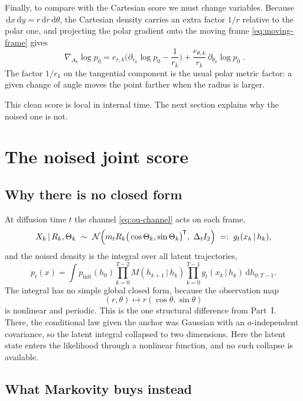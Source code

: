 \documentclass[11pt,a4paper]{article}
\newcommand{\N}{\mathcal{N}}
\newcommand{\given}{\,\vert\,}
\newcommand{\mt}{m_t}
\newcommand{\Dt}{\Delta_t}
\newcommand{\dd}{\,\mathrm d}
\newcommand{\T}{^{\mkern-1.5mu\mathsf{T}}}
\begin{document}
Finally, to compare with the Cartesian score we must change variables. Because
$\dd x\dd y=r\dd r\dd\theta$, the Cartesian density carries an extra factor $1/r$ relative to
the polar one, and projecting the polar gradient onto the moving frame
\eqref{eq:moving-frame} gives
\begin{equation}
 \boxed{\;\nabla_{A_k}\log p_0
 =e_{r,k}\Big(\partial_{r_k}\log p_0-\frac1{r_k}\Big)
 +\frac{e_{\theta,k}}{r_k}\,\partial_{\theta_k}\log p_0\;.}
 \label{eq:polar-cart-score}
\end{equation}
The factor $1/r_k$ on the tangential component is the usual polar metric factor: a given
change of angle moves the point farther when the radius is larger.

This clean score is local in internal time. The next section explains why the noised one is
not.

\section{The noised joint score}\label{sec:polar-noised}

\subsection{Why there is no closed form}

At diffusion time $t$ the channel \eqref{eq:ou-channel} acts on each frame,
\begin{equation}
 X_k\given R_k,\Theta_k\ \sim\
 \N\Big(\mt R_k\big(\cos\Theta_k,\sin\Theta_k\big)\T,\ \Dt I_2\Big)
 \;=:\;g_t(x_k\given h_k) ,
 \label{eq:polar-likelihood}
\end{equation}
and the noised density is the integral over all latent trajectories,
\begin{equation}
 p_t(x)=\int p_{\mathrm{init}}(h_0)
 \prod_{k=0}^{T-2}M(h_{k+1}\given h_k)
 \prod_{k=0}^{T-1}g_t(x_k\given h_k)\dd h_{0:T-1} .
 \label{eq:polar-noised-density}
\end{equation}
The integral has no simple global closed form, because the observation map
\[
 (r,\theta)\mapsto r(\cos\theta,\sin\theta)
\]
is nonlinear and periodic. This is the one structural difference from Part~I. There, the
conditional law given the anchor was Gaussian with an $a$-independent covariance, so the
latent integral collapsed to two dimensions. Here the latent state enters the likelihood
through a nonlinear function, and no such collapse is available.

\subsection{What Markovity buys instead}
\end{document}
